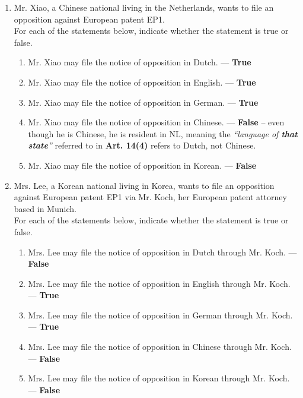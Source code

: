 \documentclass{report}
\begin{document}
\begin{enumerate}[label=\textbf{Answer \arabic*}]
\begin{enumerate}[label=\textbf{Answer \arabic*}]
\begin{enumerate}[label=(\alph*)]
        \item Mr. Xiao, a Chinese national living in the Netherlands, wants to file an opposition against European patent EP1. \\
        For each of the statements below, indicate whether the statement is true or false.
        \begin{enumerate}[label={(\alph{enumi}.\arabic*)}]
            \item Mr. Xiao may file the notice of opposition in Dutch. --- \textbf{True}
            \item Mr. Xiao may file the notice of opposition in English. --- \textbf{True}
            \item Mr. Xiao may file the notice of opposition in German. --- \textbf{True}
            \item Mr. Xiao may file the notice of opposition in Chinese. --- \textbf{False} -- even though he is Chinese, he is resident in \textsc{NL}, meaning the \textit{``language of \textbf{that state}''} referred to in \textbf{Art. 14(4)} refers to Dutch, not Chinese.
            \item Mr. Xiao may file the notice of opposition in Korean. --- \textbf{False}
        \end{enumerate}
        
        \item Mrs. Lee, a Korean national living in Korea, wants to file an opposition against European patent EP1 via Mr. Koch, her European patent attorney based in Munich. \\
        For each of the statements below, indicate whether the statement is true or false.
        \begin{enumerate}[label={(\alph{enumi}.\arabic*)}]
            \item Mrs. Lee may file the notice of opposition in Dutch through Mr. Koch. --- \textbf{False}
            \item Mrs. Lee may file the notice of opposition in English through Mr. Koch. --- \textbf{True}
            \item Mrs. Lee may file the notice of opposition in German through Mr. Koch. --- \textbf{True}
            \item Mrs. Lee may file the notice of opposition in Chinese through Mr. Koch. --- \textbf{False}
            \item Mrs. Lee may file the notice of opposition in Korean through Mr. Koch. --- \textbf{False}
        \end{enumerate}
    \end{enumerate}


\end{enumerate}
\end{enumerate}
\end{document}
